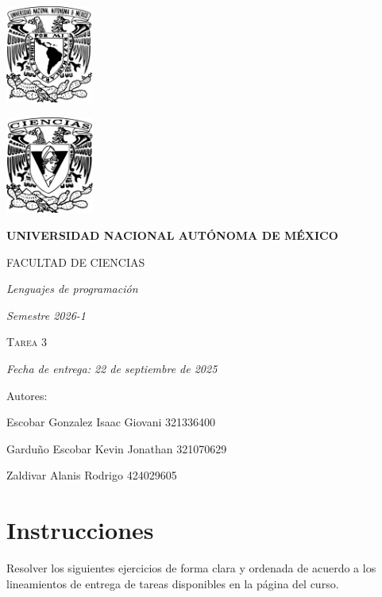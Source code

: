 \documentclass[11pt]{article}
\begin{document}
\begin{titlepage}
    \centering
    \vspace{2cm}
    {\includegraphics[height=3.2cm]{../logo_unam.png}}
    \hfill
    {\includegraphics[height=3.2cm]{../logo_fc.png}\par}
    \vspace{1cm}
    {\bfseries\LARGE UNIVERSIDAD NACIONAL AUTÓNOMA DE MÉXICO \par}
    \vspace{0.7cm}
    {\scshape\Large FACULTAD DE CIENCIAS \par}
    \vspace{1cm}
    {\itshape\Large Lenguajes de programación \par}
    \vspace{0.5cm}
    {\itshape\Large Semestre 2026-1 \par}
    \vspace{2cm}
    {\scshape\Huge Tarea 3 \par}
    \vspace{1cm}
    {\itshape\Large Fecha de entrega: 22 de septiembre de 2025 \par}
    \vspace{2cm}
    {\Large Autores: \par}
    \vspace{0.4cm}
    {\Large Escobar Gonzalez Isaac Giovani \hspace{1cm} 321336400 \par}
    {\Large Garduño Escobar Kevin Jonathan \hspace{0.5cm} 321070629 \par}
    {\Large Zaldivar Alanis Rodrigo \hspace{2.75cm} 424029605 \par}
\end{titlepage}
\section*{Instrucciones}
\noindent Resolver los siguientes ejercicios de forma clara y ordenada de acuerdo a los lineamientos de entrega de tareas disponibles en la página del curso.\\
\end{document}
